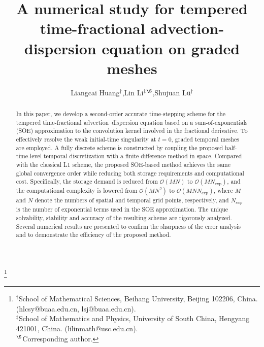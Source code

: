 \documentclass[10pt, reqno]{amsart}
\theoremstyle{remark}
\theoremstyle{definition}
\numberwithin{table}{section}
\begin{document}
	
	\graphicspath{{./figures/}}
\title[A numerical study for tempered time-fractional]
	 {A numerical study for tempered time-fractional advection-dispersion equation on graded meshes}
	\author[L. Huang,\quad L. Li,\quad S. Lü]
{\;\; Liangcai Huang${ }^{\dagger}$,\quad Lin Li${ }^{\ddagger}{ }^{\S}$,\quad  Shujuan Lü${ }^{\dagger}$ \;\;}
	
	\thanks{${ }^{\dagger}$School of Mathematical Sciences, Beihang University, Beijing 102206, China. (hlcsy@buaa.edu.cn, lsj@buaa.edu.cn).  \\
    \indent ${ }^{\ddagger}$School of Mathematics and Physics, University of South China, Hengyang 421001, China. (lilinmath@usc.edu.cn).\\
     \indent ${ }^{\S}$Corresponding author.
			}
\begin{abstract}
%
In this paper, we develop a second-order accurate time-stepping scheme for the tempered time-fractional advection–dispersion equation based on a sum-of-exponentials (SOE) approximation to the convolution kernel involved in the fractional derivative. To effectively resolve the weak initial-time singularity at $t=0$, graded temporal meshes are employed. A fully discrete scheme is constructed by coupling the proposed half-time-level temporal discretization with a finite difference method in space. Compared with the classical L1 scheme, the proposed SOE-based method achieves the same global convergence order while reducing both storage requirements and computational cost. Specifically, the storage demand is reduced from $\mathcal{O}(MN)$ to $\mathcal{O}(MN_{\mathrm{exp}})$, and the computational complexity is lowered from $\mathcal{O}(MN^2)$ to $\mathcal{O}(MN N_{\mathrm{exp}})$, where $M$ and $N$ denote the numbers of spatial and temporal grid points, respectively, and $N_{exp}$ is the number of exponential terms used in the SOE approximation. The unique solvability, stability
and accuracy of the resulting scheme are rigorously analyzed. Several numerical results are presented to confirm the sharpness of the error analysis and to demonstrate the efficiency of the proposed method.

\end{abstract}
%
\maketitle
\end{document}
